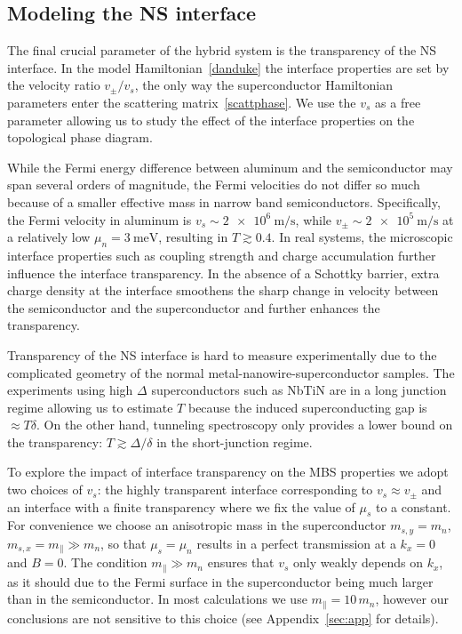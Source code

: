 \subsection{Modeling the NS interface}
\label{sub:interf}

The final crucial parameter of the hybrid system is the transparency of the NS interface.
In the model Hamiltonian~\eqref{danduke} the interface properties are set by the velocity ratio $v_\pm/v_s$, the only way the superconductor Hamiltonian parameters enter the scattering matrix~\eqref{scattphase}.
We use the $v_s$ as a free parameter allowing us to study the effect of the interface properties on the topological phase diagram.

While the Fermi energy difference between aluminum and the semiconductor may span several orders of magnitude, the Fermi velocities do not differ so much because of a smaller effective mass in narrow band semiconductors.
Specifically, the Fermi velocity in aluminum is $v_s \sim \SI{2e6}{\m/\s}$, while $v_\pm \sim \SI{2e5}{\m/\s}$ at a relatively low $\mu_n = \SI{3}{\meV}$, resulting in $T\gtrsim 0.4$.
In real systems, the microscopic interface properties such as coupling strength and charge accumulation further influence the interface transparency.
In the absence of a Schottky barrier, extra charge density at the interface smoothens the sharp change in velocity between the semiconductor and the superconductor and further enhances the transparency.

Transparency of the NS interface is hard to measure experimentally due to the complicated geometry of the normal metal-nanowire-superconductor samples.
The experiments using high $\Delta$ superconductors such as NbTiN are in a long junction regime allowing us to estimate $T$ because the induced superconducting gap is $\approx T \delta$.
On the other hand, tunneling spectroscopy only provides a lower bound on the transparency: $T \gtrsim \Delta/\delta$ in the short-junction regime.

To explore the impact of interface transparency on the MBS properties we adopt two choices of $v_s$: the highly transparent interface corresponding to $v_s \approx v_\pm$ and an interface with a finite transparency where we fix the value of $\mu_s$ to a constant.
For convenience we choose an anisotropic mass in the superconductor $m_{s,y} = m_n$, $m_{s,x} = m_\parallel \gg m_n$, so that $\mu_s = \mu_n$ results in a perfect transmission at a $k_x=0$ and $B = 0$.
The condition $m_\parallel \gg m_n$ ensures that $v_s$ only weakly depends on $k_x$, as it should due to the Fermi surface in the superconductor being much larger than in the semiconductor.
In most calculations we use $m_\parallel = 10\,m_n$, however our conclusions are not sensitive to this choice (see Appendix~\ref{sec:app} for details).


